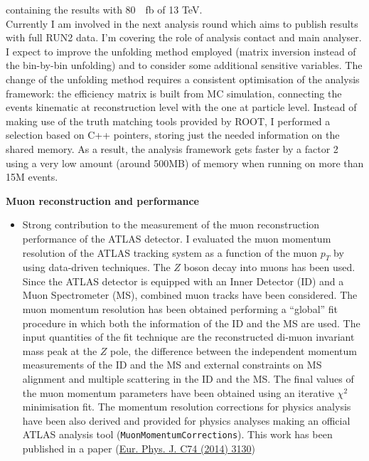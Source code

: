 \begin{cvinterests}
{\begin{itemize}[labelwidth=0.05in,align=right,leftmargin=!,labelsep=0pt,
itemsep=0.0em]
containing the results with \SI{80}{\per\femto\barn} of 13 \si{\tera\electronvolt}.\\
Currently I am involved in the next analysis round which aims to publish results
with full RUN2 data. I'm covering the role of analysis contact and main
analyser. I expect to improve the unfolding method employed (matrix inversion
instead of the bin-by-bin unfolding) and to consider some additional sensitive
variables. The change of the unfolding method requires a consistent
optimisation of the analysis framework: the efficiency matrix is built from MC
simulation, connecting the events kinematic at reconstruction level with the
one at particle level. Instead of making use of the truth matching tools
provided by ROOT, I performed a selection based on C++ pointers, storing just
the needed information on the shared memory. As a result, the analysis
framework gets faster by a factor 2 using a very low amount (around 500MB) of
memory when running on more than 15M events.
%
\end{itemize}
%
\textbf{Muon reconstruction and performance}\\
\vspace{-1.8em}
\begin{itemize}[labelwidth=0.05in,align=right,leftmargin=!,labelsep=0pt,
itemsep=0.0em]
\item[] Strong contribution to the measurement of the muon reconstruction
performance of the ATLAS detector. I evaluated the muon momentum resolution of
the ATLAS tracking system  as a function of the muon $p_{T}$ by using
data-driven techniques. The $Z$ boson decay into muons has been used. Since
the ATLAS detector is equipped with an Inner Detector (ID) and a Muon
Spectrometer (MS), combined muon tracks have been considered. The muon momentum
resolution has been obtained performing a ``global'' fit procedure in which
both the information of the ID and the MS are used. The input quantities of
the fit technique are the reconstructed di-muon invariant mass peak at the $Z$
pole, the difference between the independent momentum measurements of the ID
and the MS and external constraints on MS alignment and multiple scattering in
the ID and the MS. The final values of the muon momentum parameters have been
obtained using an iterative $\chi^{2}$ minimisation fit. The momentum resolution
corrections for physics analysis have been also derived and provided for physics
analyses making an official ATLAS analysis tool
(\texttt{MuonMomentumCorrections}). This work has been published in a paper
(\href{http://link.springer.com/article/10.1140\%2Fepjc\%2Fs10052-014-3130-x}{Eur. Phys. J. C74 (2014) 3130})

\end{itemize}}
\end{cvinterests}
